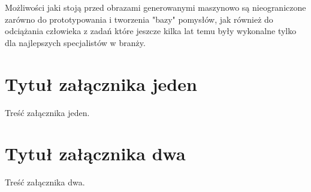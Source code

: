 \documentclass[brudnopis]{xmgr}
\begin{document}
\summary
Możliwości jaki stoją przed obrazami generowanymi maszynowo są nieograniczone zarówno do prototypowania i tworzenia "bazy" pomysłów, jak również do odciążania człowieka z zadań które jeszcze kilka lat temu były wykonalne tylko dla najlepszych specjalistów w branży.

\appendix
\chapter{Tytuł załącznika jeden}

Treść załącznika jeden.

\chapter{Tytuł załącznika dwa}

Treść załącznika dwa.





\oswiadczenie
\end{document}

